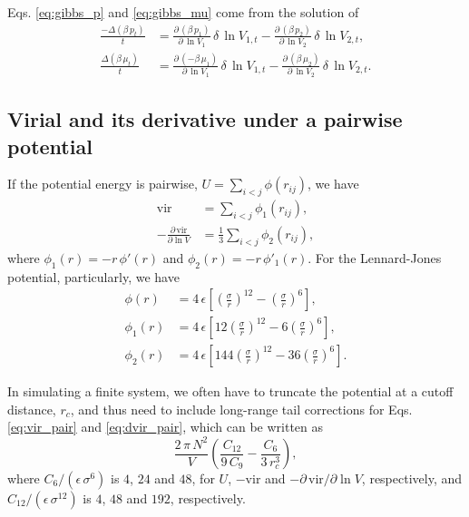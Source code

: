 \documentclass[reprint]{revtex4-1}
\begin{document}
Eqs. \eqref{eq:gibbs_p} and \eqref{eq:gibbs_mu}
come from the solution of
%
\begin{align*}
  \frac{ -\Delta( \beta \, p_t ) } { t }
  &=
  \frac{ \partial \, (\beta \, p_1 ) }
       { \partial \, \ln V_1 }
  \,
  \delta \, \ln V_{1,t}
  -
  \frac{ \partial \, (\beta \, p_2 ) }
       { \partial \, \ln V_2 }
  \,
  \delta \, \ln V_{2,t}
  ,
  \\
  \frac{ \Delta ( \beta \, \mu_t ) } { t }
  &=
  \frac{ \partial \, (-\beta \, \mu_1 ) }
       { \partial \, \ln V_1 }
  \,
  \delta \, \ln V_{1,t}
  -
  \frac{ \partial \, (\beta \, \mu_2 ) }
       { \partial \, \ln V_2 }
  \,
  \delta \, \ln V_{2,t}
  .
\end{align*}
%

\subsection{Virial and its derivative under a pairwise potential}

If the potential energy is pairwise,
$U = \sum_{i < j} \phi(r_{ij})$,
we have
%
\begin{align}
  \mathrm{vir}
  &=
  \sum_{i < j} \phi_1(r_{ij})
  ,
  \label{eq:vir_pair}
  \\
  -\frac{ \partial \, \mathrm{vir} }
        { \partial \ln V }
  &=
  \frac{1}{3}
  \sum_{i < j} \phi_2(r_{ij})
  ,
  \label{eq:dvir_pair}
\end{align}
%
where $\phi_1(r) = - r \, \phi'(r)$
and $\phi_2(r) = -r \, \phi'_1(r)$.
%
For the Lennard-Jones potential, particularly, we have
%
\begin{align*}
  \phi(r)
  &=
  4 \, \epsilon
  \left[
    \left( \frac{\sigma}{r} \right)^{12}
    -
    \left( \frac{\sigma}{r} \right)^{6}
  \right]
  ,
  \\
  \phi_1(r)
  &=
  4 \, \epsilon
  \left[
    12
    \left( \frac{\sigma}{r} \right)^{12}
    -
    6
    \left( \frac{\sigma}{r} \right)^{6}
  \right]
  ,
  \\
  \phi_2(r)
  &=
  4 \, \epsilon
  \left[
    144
    \left( \frac{\sigma}{r} \right)^{12}
    -
    36
    \left( \frac{\sigma}{r} \right)^{6}
  \right]
  .
\end{align*}

In simulating a finite system,
we often have to truncate the potential at a cutoff distance,
$r_c$, and thus need to include long-range tail corrections
for Eqs. \eqref{eq:vir_pair} and \eqref{eq:dvir_pair},
which can be written as
%
$$
  \frac{ 2 \, \pi \, N^2 } { V }
  \left(
    \frac{ C_{12} } { 9 \, C_9 }
    -
    \frac{ C_6 } { 3 \, r_c^3 }
  \right)
  ,
$$
%
where $C_6/(\epsilon \, \sigma^6)$ is $4$, $24$ and $48$,
for $U$, $-\mathrm{vir}$ and $-\partial\,\mathrm{vir}/\partial \ln V$,
respectively,
and $C_{12}/(\epsilon \, \sigma^{12})$ is
$4$, $48$ and $192$, respectively.


%

\end{document}
